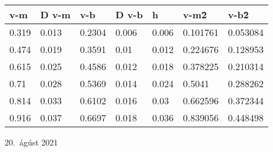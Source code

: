 \documentclass[12pt]{article}
\begin{document}
\begin{table}
    \centering
    \begin{tabular}{|l|l|l|l|l|l|l|}
    \hline
        v-m & D v-m & v-b & D v-b & h & v-m\^2 & v-b\^2 \\ \hline
        0.319 & 0.013 & 0.2304 & 0.006 & 0.006 & 0.101761 & 0.053084 \\ \hline
        0.474 & 0.019 & 0.3591 & 0.01 & 0.012 & 0.224676 & 0.128953 \\ \hline
        0.615 & 0.025 & 0.4586 & 0.012 & 0.018 & 0.378225 & 0.210314 \\ \hline
        0.71 & 0.028 & 0.5369 & 0.014 & 0.024 & 0.5041 & 0.288262 \\ \hline
        0.814 & 0.033 & 0.6102 & 0.016 & 0.03 & 0.662596 & 0.372344 \\ \hline
        0.916 & 0.037 & 0.6697 & 0.018 & 0.036 & 0.839056 & 0.448498 \\ \hline
    \end{tabular}
\end{table}



















\vfill  20.~ágúst 2021
\hfill  
\end{document}
